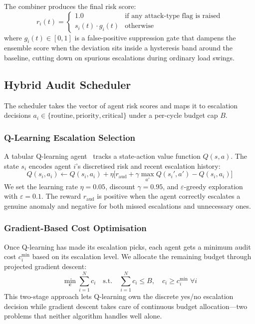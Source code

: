 \documentclass[conference]{IEEEtran}
\begin{document}
The combiner produces the final risk score:
\begin{equation}
r_i(t) =
\begin{cases}
1.0 & \text{if any attack-type flag is raised} \\
s_i(t) \cdot g_i(t) & \text{otherwise}
\end{cases}
\label{eq:combiner}
\end{equation}
where $g_i(t) \in [0,1]$ is a false-positive suppression gate that dampens the ensemble score when the deviation sits inside a hysteresis band around the baseline, cutting down on spurious escalations during ordinary load swings.

\subsection{Hybrid Audit Scheduler}

The scheduler takes the vector of agent risk scores and maps it to escalation decisions $a_i \in \{\text{routine}, \text{priority}, \text{critical}\}$ under a per-cycle budget cap $B$.

\subsubsection{Q-Learning Escalation Selection}

A tabular Q-learning agent~\cite{b14} tracks a state-action value function $Q(s, a)$. The state $s_i$ encodes agent $i$'s discretised risk and recent escalation history:
\begin{equation}
Q(s_i, a_i) \leftarrow Q(s_i, a_i) + \eta\bigl[r_{\text{aud}} + \gamma \max_{a'} Q(s_i', a') - Q(s_i, a_i)\bigr]
\label{eq:qlearn}
\end{equation}
We set the learning rate $\eta = 0.05$, discount $\gamma = 0.95$, and $\varepsilon$-greedy exploration with $\varepsilon = 0.1$. The reward $r_{\text{aud}}$ is positive when the agent correctly escalates a genuine anomaly and negative for both missed escalations and unnecessary ones.

\subsubsection{Gradient-Based Cost Optimisation}

Once Q-learning has made its escalation picks, each agent gets a minimum audit cost $c_i^{\min}$ based on its escalation level. We allocate the remaining budget through projected gradient descent:
\begin{equation}
\min_{\mathbf{c}} \sum_{i=1}^{N} c_i \quad \text{s.t.} \quad \sum_{i=1}^{N} c_i \leq B, \quad c_i \geq c_i^{\min} \;\forall i
\label{eq:optim}
\end{equation}
This two-stage approach lets Q-learning own the discrete yes/no escalation decision while gradient descent takes care of continuous budget allocation---two problems that neither algorithm handles well alone.
\end{document}
